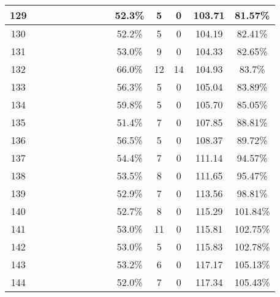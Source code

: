 \begin{longtable}{|c|c|c|c|c|c|c|c|c|c|c|c|c|c|}
129 &  \x    & \x    &       &       &       & \x    &       & \x    & 52.3\% &  5  & 0  & 103.71 & 81.57\% \\ \hline
130 &  \x    & \x    &       & \x    &       & \x    &       & \x    & 52.2\% &  5  & 0  & 104.19 & 82.41\% \\ \hline
131 &  \x    & \x    &       & \x    &       & \x\m  &       &       & 53.0\% &  9  & 0  & 104.33 & 82.65\% \\ \hline
132 &  \x    & \x    &       &       & \x\m  &       & \x\m  &       & 66.0\% &  12 & 14 & 104.93 & 83.7\% \\ \hline
133 &  \x    & \x    &       & \x    & \x    &       &       & \x    & 56.3\% &  5  & 0  & 105.04 & 83.89\% \\ \hline
134 &  \x    & \x    & \x    &       &       & \x\m  & \x\m  &       & 59.8\% &  5  & 0  & 105.70 & 85.05\% \\ \hline
135 &  \x    & \x    &       &       &       & \x\m  &       & \x\m  & 51.4\% &  7  & 0  & 107.85 & 88.81\% \\ \hline
136 &  \x    & \x    &       & \x    & \x    &       & \x    &       & 56.5\% &  5  & 0  & 108.37 & 89.72\% \\ \hline
137 &  \x    & \x    &       & \x    &       &       & \x    &       & 54.4\% &  7  & 0  & 111.14 & 94.57\% \\ \hline
138 &  \x    & \x    &       & \x    &       &       & \x\m  &       & 53.5\% &  8  & 0  & 111.65 & 95.47\% \\ \hline
139 &  \x    & \x    &       & \x    &       & \x\m  & \x\m  &       & 52.9\% &  7  & 0  & 113.56 & 98.81\% \\ \hline
140 &  \x    & \x    &       & \x    &       &       &       & \x    & 52.7\% &  8  & 0  & 115.29 & 101.84\% \\ \hline
141 &  \x    & \x    &       &       &       &       & \x\m  &       & 53.0\% &  11 & 0  & 115.81 & 102.75\% \\ \hline
142 &  \x    & \x    &       & \x    &       & \x\m  &       & \x\m  & 53.0\% &  5  & 0  & 115.83 & 102.78\% \\ \hline
143 &  \x    & \x    &       & \x    &       & \x    & \x    &       & 53.2\% &  6  & 0  & 117.17 & 105.13\% \\ \hline
144 &  \x    & \x    &       &       &       & \x\m  & \x\m  &       & 52.0\% &  7  & 0  & 117.34 & 105.43\% \\ \hline
\end{longtable}
\normalsize

